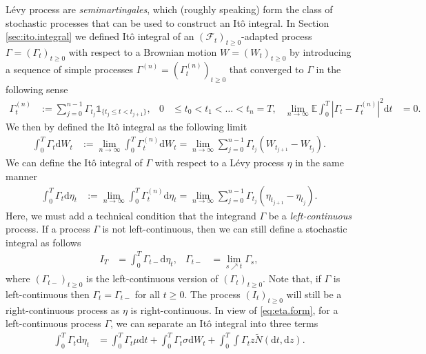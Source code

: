 \documentclass[12pt]{book}
\numberwithin{equation}{chapter}
\theoremstyle{plain}
\numberwithin{theorem}{section}
\theoremstyle{definition}
\numberwithin{exercise}{chapter}
\newcommand{\<}{\langle}
\renewcommand{\>}{\rangle}
\renewcommand{\(}{\left(}
\renewcommand{\)}{\right)}
\renewcommand{\[}{\left[}
\renewcommand{\]}{\right]}
\newcommand\Eb{\mathds{E}}
\newcommand\Ib{\mathds{1}} 	%
\newcommand\Fc{\mathscr{F}}
\newcommand\sig{\sigma}
\newcommand\Gam{\Gamma}
\newcommand\Nt{\widetilde{N}}
\newcommand\dd{\mathrm{d}}
\begin{document}
\noindent
L\'evy process are \emph{semimartingales}, which (roughly speaking) form the class of stochastic processes that can be used to construct an It\^o integral.  In Section \ref{sec:ito.integral} we defined It\^o integral of an $(\Fc_t)_{t \geq 0}$-adapted process $\Gam = (\Gam_t)_{t \geq 0}$ with respect to a Brownian motion $W = (W_t)_{t \geq 0}$ by introducing a sequence of simple processes $\Gam^{(n)} = (\Gam_t^{(n)})_{t \geq 0}$ that converged to $\Gam$ in the following sense
\begin{align}
\Gam_t^{(n)}
	&:=	\sum_{j=0}^{n-1} \Gam_{t_j} \Ib_{\{ t_j \leq t < t_{j+1} \}} , &
0
	&\leq t_0 < t_1 < \ldots < t_n = T , &
\lim_{n \to \infty} \Eb \int_0^T | \Gam_t - \Gam_t^{(n)} |^2 \dd t
	&=	0 .
\end{align}
We then by defined the It\^o integral as the following limit
\begin{align}
\int_0^T \Gam_t \dd W_t
	&:=	\lim_{n \to \infty} \int_0^T \Gam_t^{(n)} \dd W_t
	=		\lim_{n \to \infty} \sum_{j=0}^{n-1} \Gam_{t_j} (W_{t_{j+1}} - W_{t_j}) .
\end{align}
We can define the It\^o integral of $\Gam$ with respect to a L\'evy process $\eta$ in the same manner
\begin{align}
\int_0^T \Gam_t \dd \eta_t
	&:=	\lim_{n \to \infty} \int_0^T \Gam_t^{(n)} \dd \eta_t
	=		\lim_{n \to \infty} \sum_{j=0}^{n-1} \Gam_{t_j} (\eta_{t_{j+1}} - \eta_{t_j}) .
\end{align}
Here, we must add a technical condition that the integrand $\Gam$ be a \emph{left-continuous} process.  
If a process $\Gam$ is not left-continuous, then we can still define a stochastic integral as follows
\begin{align}
I_T
	&= \int_0^T \Gam_{t-} \dd \eta_t , &
\Gam_{t-}
	&=	\lim_{s \nearrow t} \Gam_s , 
\end{align}
where $(\Gam_{t-})_{t \geq 0}$ is the left-continuous version of $(\Gam_t)_{t \geq 0}$.  
Note that, if $\Gam$ is left-continuous then $\Gam_t = \Gam_{t-}$ for all $t \geq 0$.
The process $(I_t)_{t \geq 0}$ will still be a right-continuous process as $\eta$ is right-continuous.
In view of \eqref{eq:eta.form},
for a left-continuous process $\Gam$, we can separate an It\^o integral into three terms
\begin{align}
\int_0^T \Gam_{t} \dd \eta_t
	&= 	\int_0^T \Gam_t \mu \dd t + \int_0^T \Gam_t \sig \dd W_t + \int_0^T \int \Gam_{t} z \Nt( \dd t , \dd z ) . \label{eq:I.again}
\end{align}
\end{document}
